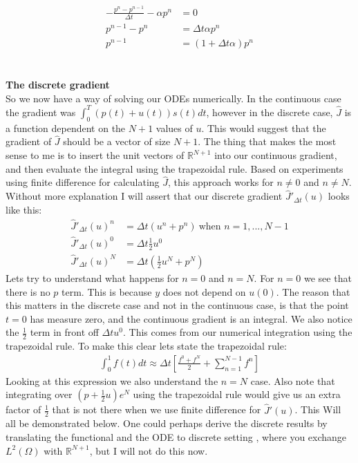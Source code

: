 \documentclass[11pt,a4paper]{report}
\begin{document}
\begin{align*}
-\frac{p^n-p^{n-1}}{\Delta t} -\alpha p^n &=0 \\
p^{n-1} -p^n &=\Delta t\alpha p^n \\
p^{n-1} &= (1+\Delta t\alpha)p^n
\end{align*}
\\
\\
\textbf{The discrete gradient}
\\
So we now have a way of solving our ODEs numerically. In the continuous case the gradient was $\int_0^T(p(t)+u(t))s(t)dt$, however in the discrete case, $\hat{J}$ is a function dependent on the $N+1$ values of $u$. This would suggest that the gradient of $\hat{J}$ should be a vector of size $N+1$. The thing that makes the most sense to me is to insert the unit vectors of $\mathbb{R}^{N+1}$ into our continuous gradient, and then evaluate the integral using the trapezoidal rule. Based on experiments using finite difference for calculating $\hat{J}$, this approach works for $n\neq 0$ and $n\neq N$. Without more explanation I will assert that our discrete gradient $\hat{J}'_{\Delta t}(u)$ looks like this:
\begin{align*}
\hat{J}'_{\Delta t}(u)^n&=\Delta t(u^n+p^n) \ \text{when $n=1,...,N-1$} \\
\hat{J}'_{\Delta t}(u)^0&=\Delta t \frac{1}{2}u^0 \\
\hat{J}'_{\Delta t}(u)^N&=\Delta t(\frac{1}{2}u^N+p^N)
\end{align*} 
Lets try to understand what happens for $n=0$ and $n=N$. For $n=0$ we see that there is no $p$ term. This is because $y$ does not depend on $u(0)$. The reason that this matters in the discrete case and not in the continuous case, is that the point $t=0$ has measure zero, and the continuous gradient is an integral. We also notice the $\frac{1}{2}$ term in front off $\Delta t u^0$. This comes from our numerical integration using the trapezoidal rule. To make this clear lets state the trapezoidal rule:
\begin{align*}
\int_0^1 f(t)dt \approx \Delta t[\frac{f^0+f^N}{2}+\sum_{n=1}^{N-1}f^n]
\end{align*} 
Looking at this expression we also understand the $n=N$ case. Also note that integrating over $(p + \frac{1}{2}u)e^N$ using the trapezoidal rule would give us an extra factor of $\frac{1}{2}$ that is not there when we use finite difference for $\hat{J}'(u)$. This Will all be demonstrated below. One could perhaps derive the discrete results by translating the functional and the ODE to discrete setting , where you exchange $L^2(\Omega)$ with $\mathbb{R}^{N+1}$, but I will not do this now. 
\end{document}
